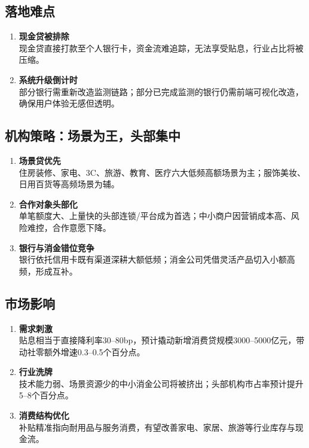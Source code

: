 \subsection{落地难点}
\begin{enumerate}[leftmargin=*, nosep]
    \item \textbf{现金贷被排除}  \\
    现金贷直接打款至个人银行卡，资金流难追踪，无法享受贴息，行业占比将被压缩。
    \item \textbf{系统升级倒计时}  \\
    部分银行需重新改造监测链路；部分已完成监测的银行仍需前端可视化改造，确保用户体验无感但透明。
\end{enumerate}

\subsection{机构策略：场景为王，头部集中}
\begin{enumerate}[leftmargin=*, nosep]
    \item {\color{red}\textbf{场景贷优先}}\\
    住房装修、家电、3C、旅游、教育、医疗六大低频高额场景为主；服饰美妆、日用百货等高频场景为辅。
    \item \textbf{合作对象头部化}  \\
    单笔额度大、上量快的头部连锁/平台成为首选；中小商户因营销成本高、风险难控，合作意愿下降。
    \item \textbf{银行与消金错位竞争}  \\
    银行依托信用卡既有渠道深耕大额低频；消金公司凭借灵活产品切入小额高频，形成互补。
\end{enumerate}

\subsection{市场影响}
\begin{enumerate}[leftmargin=*, nosep]
    \item \textbf{需求刺激}  \\
    贴息相当于直接降利率30–80bp，预计撬动新增消费贷规模3000–5000亿元，带动社零额外增速0.3–0.5个百分点。
    \item \textbf{行业洗牌}  \\
     {\color{red}技术能力弱、场景资源少的中小消金公司将被挤出；头部机构市占率预计提升5–8个百分点。}
    \item \textbf{消费结构优化}  \\
    补贴精准指向耐用品与服务消费，有望改善家电、家居、旅游等行业库存与现金流。
\end{enumerate}


